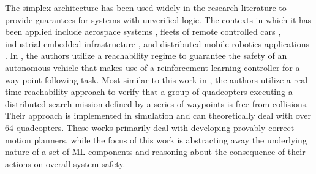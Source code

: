 \documentclass[manuscript,screen,review]{acmart}
\newcommand{\diego}[1]{\textcolor{purple}{\textbf{\underline{DM:}} #1}}
\begin{document}


The simplex architecture has been used widely in the research literature to provide guarantees for systems with unverified logic. The contexts in which it has been applied include aerospace systems \cite{SetoCaseStudy2000}, fleets of remote controlled cars \cite{Crenshaw2007}, industrial embedded infrastructure \cite{Bak2009Simplex,Yang2017}, and distributed mobile robotics applications \cite{Desai2018,Tran2020}. In \cite{Lin2020}, the authors utilize a reachability regime to guarantee the safety of an autonomous vehicle that makes use of a reinforcement learning controller for a way-point-following task. Most similar to this work in \cite{Tran2020}, the authors utilize a real-time reachability approach to verify that a group of quadcopters executing a distributed search mission defined by a series of waypoints is free from collisions. Their approach is implemented in simulation and can theoretically deal with over 64 quadcopters. These works primarily deal with developing provably correct motion planners, while the focus of this work is abstracting away the underlying nature of a set of ML components and reasoning about the consequence of their actions on overall system safety.



\end{document}
